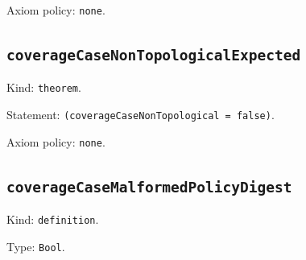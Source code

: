 \documentclass[11pt]{article}
\begin{document}
\noindent Axiom policy: \texttt{none}.\par
\subsection*{\texttt{coverageCaseNonTopologicalExpected}}
\noindent Kind: \texttt{theorem}.\par
\noindent Statement: \texttt{(coverageCaseNonTopological = false)}.\par
\noindent Axiom policy: \texttt{none}.\par
\subsection*{\texttt{coverageCaseMalformedPolicyDigest}}
\noindent Kind: \texttt{definition}.\par
\noindent Type: \texttt{Bool}.\par
\end{document}

